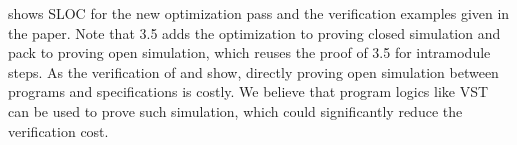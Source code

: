  shows SLOC for the new optimization pass and the verification examples
given in the paper.  Note that  3.5 adds the optimization to \ccr{} proving closed simulation
and  pack to \ccm{} proving open simulation, which reuses the proof of  3.5 for intramodule steps.
As the verification of  and  show, directly proving
open simulation between programs and specifications is costly. 
We believe that program logics like VST~\cite{VST} can be used to prove such simulation,
which could significantly reduce the verification cost.










